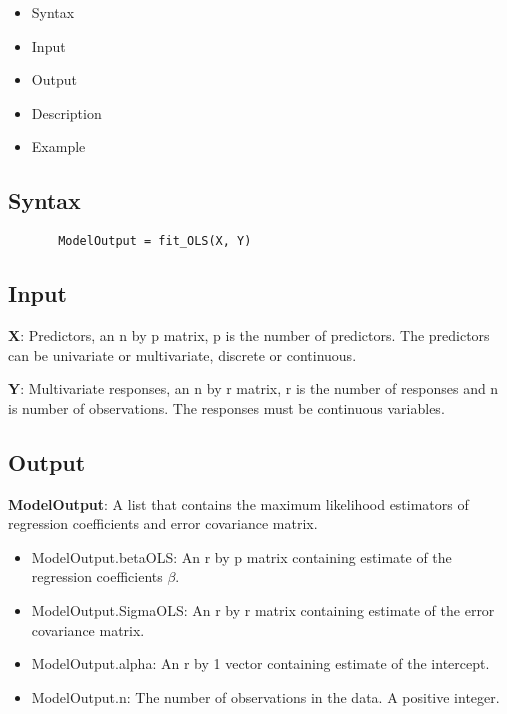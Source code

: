 \documentclass[a4paper,11pt,openany]{memoir}
\begin{document}
\begin{itemize}
\setlength{\itemsep}{-1ex}
   \item Syntax
   \item Input
   \item Output
   \item Description
   \item Example
\end{itemize}


\subsection*{Syntax}


\begin{verbatim}       ModelOutput = fit_OLS(X, Y)\end{verbatim}
    

\subsection*{Input}

\begin{par}
\textbf{X}: Predictors, an n by p matrix, p is the number of predictors.  The predictors can be univariate or multivariate, discrete or continuous.
\end{par} \vspace{1em}
\begin{par}
\textbf{Y}: Multivariate responses, an n by r matrix, r is the number of responses and n is number of observations.  The responses must be continuous variables.
\end{par} \vspace{1em}


\subsection*{Output}

\begin{par}
\textbf{ModelOutput}: A list that contains the maximum likelihood estimators of regression coefficients and error covariance matrix.
\end{par} \vspace{1em}
\begin{itemize}
\setlength{\itemsep}{-1ex}
   \item ModelOutput.betaOLS: An r by p matrix containing estimate of the regression coefficients $\beta$.
   \item ModelOutput.SigmaOLS: An r by r matrix containing estimate of the error covariance matrix.
   \item ModelOutput.alpha: An r by 1 vector containing estimate of the intercept.
   \item ModelOutput.n: The number of observations in the data.  A positive integer.
\end{itemize}
\end{document}
